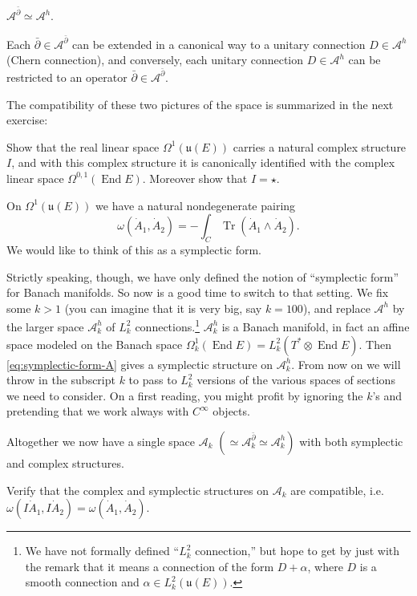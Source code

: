 \documentclass[12pt,letterpaper,reqno]{article}
\numberwithin{equation}{section}
\newcommand{\fu}{{\mathfrak u}}
\newcommand{\cA}{\ensuremath{\mathcal A}}
\DeclareMathOperator{\Tr}{Tr}
\DeclareMathOperator{\End}{End}
\begin{document}
\begin{prop}[Unitary connections = holomorphic structures]
$\cA^{\bar\partial} \simeq \cA^h$.
\end{prop}
\begin{pf} Each $\bar\partial \in \cA^{\bar\partial}$
can be extended in a canonical way to a unitary connection $D \in \cA^h$
(Chern connection), and conversely, each unitary connection $D \in \cA^h$
can be restricted to an operator $\bar\partial \in \cA^{\bar\partial}$.
\end{pf}

The compatibility of these two pictures of the space
is summarized in the next exercise:

\begin{exercise} Show that the real linear space
$\Omega^{1}(\fu(E))$ carries a natural complex structure $I$,
and with this complex structure it is canonically identified
with the complex linear space $\Omega^{0,1}(\End E)$.
Moreover show that $I = \star$.
\end{exercise}

On $\Omega^{1}(\fu(E))$ we have a natural nondegenerate pairing
\begin{equation} \label{eq:symplectic-form-A}
  \omega(\dot{A}_1,\dot{A}_2) = -\int_C \Tr(\dot{A}_1 \wedge \dot{A}_2).
\end{equation}
We would like to think of this as a symplectic form.

Strictly speaking, though, we have only defined the notion
of ``symplectic form'' for Banach manifolds.
So now is a good time to switch to that setting.
We fix some $k > 1$ (you can imagine that it is very big,
say $k = 100$), and replace $\cA^h$ by the larger space $\cA^h_k$
of $L^2_k$ connections.\footnote{We have not formally defined
``$L^2_k$ connection,'' but hope to get by just with the remark
that it means a connection of the form $D + \alpha$,
where $D$ is a smooth connection and $\alpha \in L^2_k(\fu(E))$.}
$\cA^h_k$ is a Banach manifold,
in fact an affine space modeled on the Banach space
$\Omega^1_k(\End E) = L^2_k(T^* \otimes \End E)$.
Then \eqref{eq:symplectic-form-A} gives a symplectic
structure on $\cA^h_k$.
From now on we will throw in the subscript $k$ to pass
to $L^2_k$ versions of the various spaces of sections
we need to consider. On a first reading, you might profit
by ignoring the $k$'s and pretending that we work always
with $C^\infty$ objects.

Altogether we now have a single space $\cA_k$ $(\simeq \cA^{\bar\partial}_k \simeq \cA^h_k)$ with both symplectic and
complex structures.
\begin{exercise} Verify that the complex and symplectic structures
on $\cA_k$ are compatible, i.e. $\omega(I \dot{A}_1, I \dot{A}_2) = \omega(\dot{A}_1,\dot{A}_2)$.
\end{exercise}
\end{document}
